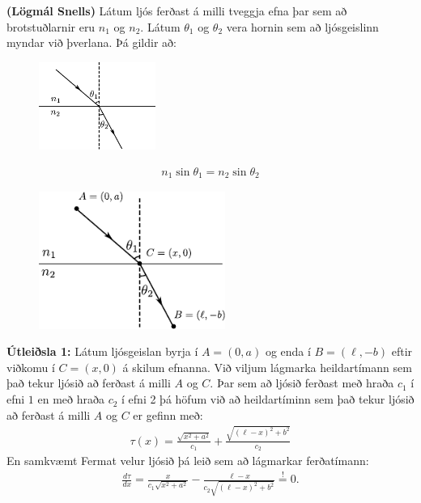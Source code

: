 \ifdefined \wholebook \else\documentclass[oneside]{book}\usepackage{EdlBook}\graphicspath{{figures/}}
\begin{document}
\begin{tcolorbox}
\begin{theorem} \textbf{(Lögmál Snells)} Látum ljós ferðast á milli tveggja efna þar sem að brotstuðlarnir eru $n_1$ og $n_2$. Látum $\theta_1$ og $\theta_2$ vera hornin sem að ljósgeislinn myndar við þverlana. Þá gildir að:
\begin{minipage}{\linewidth}
\begin{figure}
\includegraphics[width = 1.5in]{figures/snell1.pdf}
\end{figure}
\begin{align*}
    n_1 \sin\theta_1 = n_2 \sin\theta_2
\end{align*}
\vspace{1.4cm}
\end{minipage}
\end{theorem}
\end{tcolorbox}


\begin{minipage}{\linewidth}
\begin{figure}
\includegraphics[width = 2.4in]{figures/snell2.pdf}
\end{figure}

\textbf{Útleiðsla 1:} Látum ljósgeislan byrja í $A = (0,a)$ og enda í $B = (\ell, -b)$ eftir viðkomu í $C = (x,0)$ á skilum efnanna. Við viljum lágmarka heildartímann sem það tekur ljósið að ferðast á milli $A$ og $C$. Þar sem að ljósið ferðast með hraða $c_1$ í efni $1$ en með hraða $c_2$ í efni 2 þá höfum við að heildartíminn sem það tekur ljósið að ferðast á milli $A$ og $C$ er gefinn með:
\begin{align*}
    \tau(x) = \frac{\sqrt{x^2+a^2}}{c_1} + \frac{\sqrt{\left( \ell - x \right)^2 + b^2}}{c_2}
\end{align*}
En samkvæmt Fermat velur ljósið þá leið sem að lágmarkar ferðatímann:
\begin{align*}
    \frac{d\tau}{dx} = \frac{x}{c_1\sqrt{x^2+a^2}} - \frac{\ell-x}{c_2 \sqrt{(\ell-x)^2+b^2}} \stackrel{!}{=} 0.
\end{align*}
\end{minipage}
\end{document}
